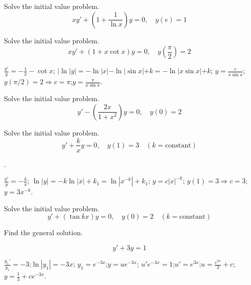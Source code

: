 \documentclass{ximera}
\begin{document}
\begin{problem}\label{exer:2.1.7} Solve
the initial value problem.
$$xy'+\left(1+\frac{1}{\ln x}\right)y=0,\quad y(e)=1$$
\end{problem}

\begin{problem}\label{exer:2.1.8} Solve
the initial value problem.
$$xy'+(1+ x\cot x)y=0,\quad y\left(\frac{\pi}{2}
\right)=2$$



\begin{solution}
    $\frac{y'}{y}=-\frac{1}{x}-\cot x$;
\quad $|\ln|y|=-\ln|x|-\ln|\sin x|+k=-\ln|x\sin x|+k$;\quad
$y=\frac{c}{x\sin x}$;\quad $y(\pi/2)=2\Rightarrow
c=\pi$;\quad $y=\frac{\pi}{x\sin x}$.
\end{solution}
\end{problem}

\begin{problem}\label{exer:2.1.9} Solve
the initial value problem.
$$y'-\left(\frac{2x}{1+x^2}\right)y=0,\quad y(0)=2$$
\end{problem}

\begin{problem}\label{exer:2.1.10} Solve
the initial value problem.
$$y'+\frac{k}{x}y=0,\quad y(1)=3 \quad (k=
\mbox{constant})$$

.

\begin{solution}
    $\frac{y'}{ y}=-\frac{k}{ x}$;\quad
$\ln|y|=-k\ln|x|+k_1=\ln|x^{-k}|+k_1$;\quad
$y=c|x|^{-k}$;\quad
$y(1)=3\Rightarrow c=3$;\quad $y=3x^{-k}$.
\end{solution}
\end{problem}

\begin{problem}\label{exer:2.1.11} Solve
the initial value problem.
$$y'+(\tan kx)y=0,\quad y(0)=2 \quad (k= \mbox{constant})$$
\end{problem}


\begin{problem}\label{exer:2.1.12} Find
the general solution. 

$$y'+3y=1$$





\begin{solution}
    $\frac{y_1'}{ y_1}=-3$;\quad $\ln|y_1|=-3x$;\quad
$y_1=e^{-3x}$;\quad $y=ue^{-3x}$;\quad
$u'e^{-3x}=1$;\quad $u'=e^{3x}$;\quad $u=\frac{e^{3x}}{3}+c$;\quad
$y=\frac{1}{3}+ce^{-3x}$.
\end{solution}

\end{problem}
\end{document}
